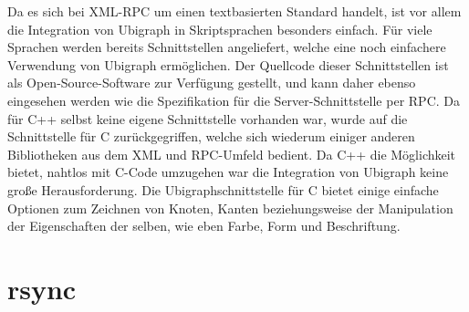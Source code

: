 Da es sich bei XML-RPC um einen textbasierten Standard handelt, ist vor allem die Integration von Ubigraph in Skriptsprachen besonders einfach. Für viele Sprachen werden bereits Schnittstellen angeliefert,
welche eine noch einfachere Verwendung von Ubigraph ermöglichen. Der Quellcode dieser Schnittstellen ist als Open-Source-Software zur Verfügung gestellt, und kann daher ebenso eingesehen werden wie die
Spezifikation für die Server-Schnittstelle per RPC. Da für C++ selbst keine eigene Schnittstelle vorhanden war, wurde auf die Schnittstelle für C zurückgegriffen, welche sich wiederum einiger anderen Bibliotheken
aus dem XML und RPC-Umfeld bedient. Da C++ die Möglichkeit bietet, nahtlos mit C-Code umzugehen war die Integration von Ubigraph keine große Herausforderung. Die Ubigraphschnittstelle für C bietet einige
einfache Optionen zum Zeichnen von Knoten, Kanten beziehungsweise der Manipulation der Eigenschaften der selben, wie eben Farbe, Form und Beschriftung.


\section{rsync}
